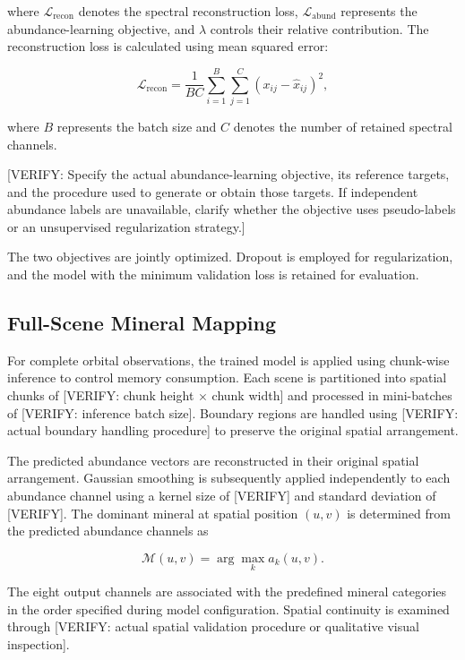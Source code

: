 \documentclass[runningheads]{llncs}
\begin{document}
where $\mathcal{L}_{\mathrm{recon}}$ denotes the spectral
reconstruction loss, $\mathcal{L}_{\mathrm{abund}}$ represents
the abundance-learning objective, and $\lambda$ controls their
relative contribution. The reconstruction loss is calculated
using mean squared error:

\begin{equation}
\mathcal{L}_{\mathrm{recon}}
=
\frac{1}{BC}
\sum_{i=1}^{B}
\sum_{j=1}^{C}
(x_{ij}-\hat{x}_{ij})^2,
\label{eq:reconstruction_loss}
\end{equation}

where $B$ represents the batch size and $C$ denotes the number
of retained spectral channels.

[VERIFY: Specify the actual abundance-learning objective,
its reference targets, and the procedure used to generate
or obtain those targets. If independent abundance labels
are unavailable, clarify whether the objective uses
pseudo-labels or an unsupervised regularization strategy.]

The two objectives are jointly optimized. Dropout
is employed for regularization, and the model with the minimum
validation loss is retained for evaluation.

\subsection{Full-Scene Mineral Mapping}
\label{subsec:scene_mapping}

For complete orbital observations, the trained model is applied
using chunk-wise inference to control memory consumption. Each
scene is partitioned into spatial chunks of
[VERIFY: chunk height $\times$ chunk width] and processed
in mini-batches of [VERIFY: inference batch size].
Boundary regions are handled using [VERIFY: actual boundary
handling procedure] to preserve the original spatial
arrangement.

The predicted abundance vectors are reconstructed in their
original spatial arrangement. Gaussian smoothing is subsequently
applied independently to each abundance channel using a kernel
size of [VERIFY] and standard deviation of [VERIFY].
The dominant mineral at spatial position $(u,v)$ is determined
from the predicted abundance channels as

\begin{equation}
\mathcal{M}(u,v)
=
\arg\max_{k}\hat{a}_{k}(u,v).
\label{eq:mineral_map}
\end{equation}

The eight output channels are associated with the predefined
mineral categories in the order specified during model
configuration. Spatial continuity is examined through
[VERIFY: actual spatial validation procedure or qualitative
visual inspection].
\end{document}

